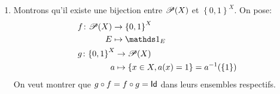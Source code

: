 {\begin{td-sol}[]
\begin{enumerate}
\begin{itemize}
                \item On utilise les lois de De Morgan pour simplifier les calculs:
                \begin{equation*}
                    \begin{aligned}
                        \one_{A\cup B} 
                        &= \one_{{\left({(A\cup B)}^{\color{red} C\color{black}}\right)}^{\color{red} C\color{black}}}\\
                        &= 1 - \one_{\comp{\left(A\cup B\right)}}\\
                        &= 1 - \one_{\comp A\cap\comp B}\\
                        &= 1 - \left(1 - \one_A\right)\left(1-\one_B\right)\\
                        &= 1 - \left(1 - \one_A - \one_B + \one_A\one_B\right)\\
                        &= \one_A + \one_B - \one_A\one_B
                    \end{aligned}
                \end{equation*}
            \end{itemize}

            \item Montrons qu'il existe une bijection entre \(\mathscr{P}(X)\) et \({\left\{0,1\right\}}^X\). On pose:
            \begin{equation*}
                \begin{aligned}
                    &\begin{aligned}
                        f\colon \scr P(X)
                        &\to {\left\{0,1\right\}}^X\\
                        E&\mapsto \one_E
                    \end{aligned}\\
                    &\begin{aligned}
                        g\colon{\left\{0,1\right\}}^X
                        &\to \scr P(X)\\
                        a&\mapsto \left\{x\in X,a(x)=1\right\}=a^{-1}(\{1\})
                    \end{aligned}
                \end{aligned}
            \end{equation*}
            On veut montrer que \(g\circ f=f\circ g = \operatorname{\mathsf{Id}}\) dans leurs ensembles respectifs.


\end{enumerate}
\end{td-sol}}
